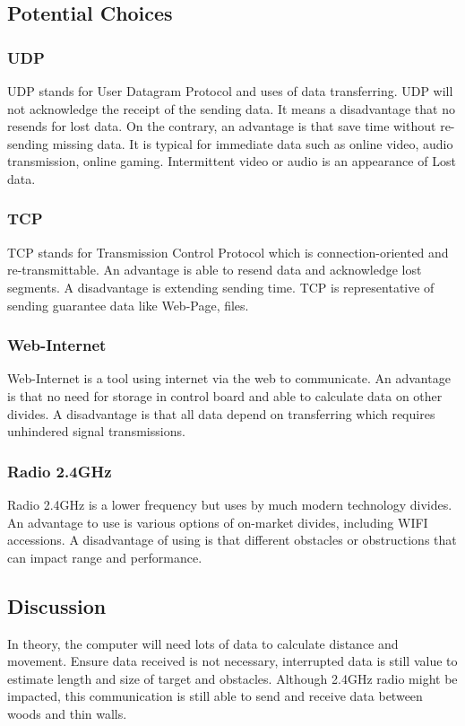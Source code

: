 \documentclass[letterpaper, 10, draftclsnofoot, onecolumn]{IEEEtran}
\begin{document}
\subsection*{Potential Choices}
\subsubsection*{UDP}\hfill \break
UDP \cite{UDP}stands for User Datagram Protocol and uses of data transferring. UDP will not acknowledge the receipt of the sending data. It means a disadvantage that no resends for lost data. On the contrary, an advantage is that save time without re-sending missing data. It is typical for immediate data such as online video, audio transmission, online gaming. Intermittent video or audio is an appearance of Lost data.
\subsubsection*{TCP}\hfill \break
TCP \cite{TCP}stands for Transmission Control Protocol which is connection-oriented and re-transmittable. An advantage is able to resend data and acknowledge lost segments. A disadvantage is extending sending time. TCP is representative of sending guarantee data like Web-Page, files.
\subsubsection*{Web-Internet}\hfill \break
Web-Internet is a tool using internet via the web to communicate. An advantage is that no need for storage in control board and able to calculate data on other divides. A disadvantage is that all data depend on transferring which requires unhindered signal transmissions.
\subsubsection*{Radio 2.4GHz}\hfill \break
Radio 2.4GHz is a lower frequency but uses by much modern technology divides. An advantage to use is various options of on-market divides, including WIFI accessions. A disadvantage of using is that different obstacles or obstructions that can impact range and performance. 
\subsection*{Discussion}\hfill \break 
In theory, the computer will need lots of data to calculate distance and movement. Ensure data received is not necessary, interrupted data is still value to estimate length and size of target and obstacles. Although 2.4GHz radio might be impacted, this communication is still able to send and receive data between woods and thin walls. 
\end{document}
